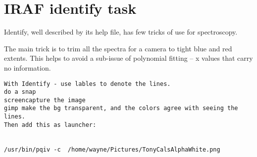 \section{IRAF identify task}

Identify, well described by its help file, has few tricks of use for spectroscopy.

The main trick is to trim all the spectra for a camera to tight blue and red extents.
This helps to avoid a sub-issue of polynomial fitting -- x values that carry no
information. 


\begingroup \fontsize{10pt}{10pt}
\selectfont
\begin{verbatim} 
With Identify - use lables to denote the lines.
do a snap
screencapture the image
gimp make the bg transparent, and the colors agree with seeing the lines.
Then add this as launcher:


/usr/bin/pqiv -c  /home/wayne/Pictures/TonyCalsAlphaWhite.png
\end{verbatim}
\endgroup

